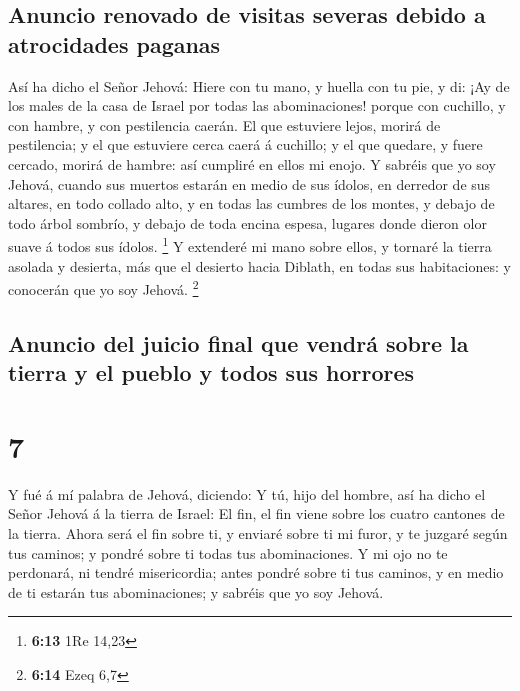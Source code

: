 \hypertarget{anuncio-renovado-de-visitas-severas-debido-a-atrocidades-paganas}{%
\subsection{Anuncio renovado de visitas severas debido a atrocidades
paganas}\label{anuncio-renovado-de-visitas-severas-debido-a-atrocidades-paganas}}

 Así ha dicho el Señor Jehová: Hiere con tu mano, y
huella con tu pie, y di: ¡Ay de los males de la casa de Israel por todas
las abominaciones! porque con cuchillo, y con hambre, y con pestilencia
caerán.  El que estuviere lejos, morirá de pestilencia; y
el que estuviere cerca caerá á cuchillo; y el que quedare, y fuere
cercado, morirá de hambre: así cumpliré en ellos mi enojo.
 Y sabréis que yo soy Jehová, cuando sus muertos estarán
en medio de sus ídolos, en derredor de sus altares, en todo collado
alto, y en todas las cumbres de los montes, y debajo de todo árbol
sombrío, y debajo de toda encina espesa, lugares donde dieron olor suave
á todos sus ídolos. \footnote{\textbf{6:13} 1Re 14,23}  Y
extenderé mi mano sobre ellos, y tornaré la tierra asolada y desierta,
más que el desierto hacia Diblath, en todas sus habitaciones: y
conocerán que yo soy Jehová. \footnote{\textbf{6:14} Ezeq 6,7}

\hypertarget{anuncio-del-juicio-final-que-vendruxe1-sobre-la-tierra-y-el-pueblo-y-todos-sus-horrores}{%
\subsection{Anuncio del juicio final que vendrá sobre la tierra y el
pueblo y todos sus
horrores}\label{anuncio-del-juicio-final-que-vendruxe1-sobre-la-tierra-y-el-pueblo-y-todos-sus-horrores}}

\hypertarget{section-6}{%
\section{7}\label{section-6}}

 Y fué á mí palabra de Jehová, diciendo:  Y
tú, hijo del hombre, así ha dicho el Señor Jehová á la tierra de Israel:
El fin, el fin viene sobre los cuatro cantones de la tierra.
 Ahora será el fin sobre ti, y enviaré sobre ti mi furor,
y te juzgaré según tus caminos; y pondré sobre ti todas tus
abominaciones.  Y mi ojo no te perdonará, ni tendré
misericordia; antes pondré sobre ti tus caminos, y en medio de ti
estarán tus abominaciones; y sabréis que yo soy Jehová.

